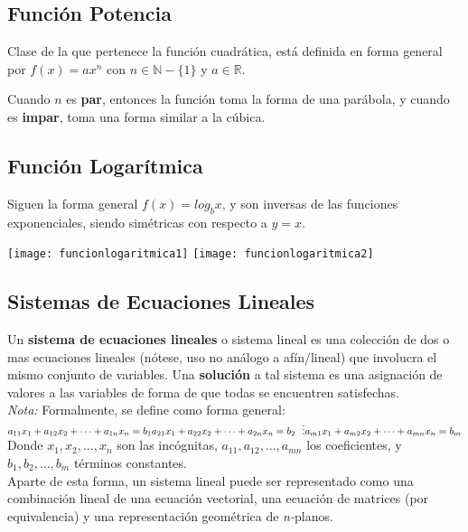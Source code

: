 \subsection{Función Potencia}
Clase de la que pertenece la función cuadrática, está definida en forma general por $f(x) = ax^n$ con $n \in \mathbb{N} - \{1\}$ y $a \in \mathbb{R}$.

Cuando $n$ es \textbf{par}, entonces la función toma la forma de una parábola, y cuando es \textbf{impar}, toma una forma similar a la cúbica.

\subsection{Función Logarítmica}
Siguen la forma general $f(x) = log_b{x}$, y son inversas de las funciones exponenciales, siendo simétricas con respecto a $y = x$.\\
\begin{minipage}[c]{\columnwidth}
    \texttt{[image: funcionlogaritmica1]}
    \texttt{[image: funcionlogaritmica2]}
\end{minipage}

\subsection{Sistemas de Ecuaciones Lineales}
Un \textbf{sistema de ecuaciones lineales} o sistema lineal es una colección de dos o mas ecuaciones lineales (nótese, uso no análogo a afín/lineal) que involucra el mismo conjunto de variables. Una \textbf{solución} a tal sistema es una asignación de valores a las variables de forma de que todas se encuentren satisfechas.\\

\textit{Nota:} Formalmente, se define como forma general:\\
$a_{11} x_1 + a_{12} x_2  + \cdots + a_{1n} x_n  = b_1 \\
    a_{21} x_1 + a_{22} x_2  + \cdots + a_{2n} x_n  = b_2 \\
    \ \ \vdots\\
    a_{m1} x_1 + a_{m2} x_2  + \cdots + a_{mn} x_n  = b_ m$\\
    Donde $x_1, x_2,\ldots,x_n$ son las incógnitas, $a_{11},a_{12},\ldots,a_{mn}$ los coeficientes, y $b_1,b_2,\ldots,b_m$ términos constantes.\\

    Aparte de esta forma, un sistema lineal puede ser representado como una combinación lineal de una ecuación vectorial, una ecuación de matrices (por equivalencia) y una representación geométrica de \textit{n-}planos.
